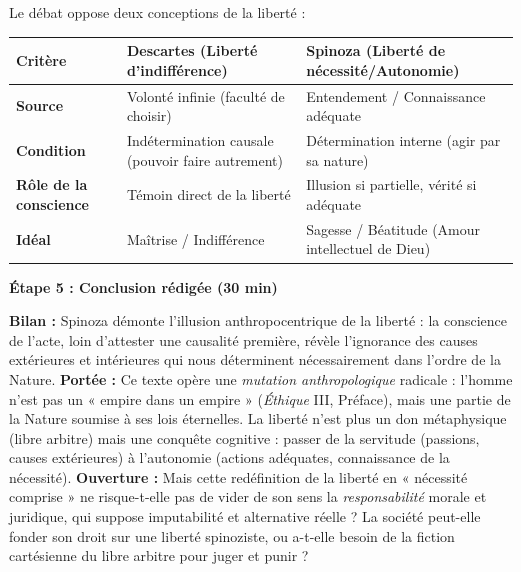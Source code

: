 \documentclass[11pt]{article}
\newcommand{\cle}[1]{{\popxbold\color{popdark}#1}}
\begin{document}
\begin{aretenir}
Le débat oppose deux conceptions de la liberté :
\begin{center}
\begin{tabularx}{\linewidth}{|l|X|X|}\hline
\rowcolor{popblueL}
\textbf{Critère} & \textbf{Descartes (Liberté d'indifférence)} & \textbf{Spinoza (Liberté de nécessité/Autonomie)} \\\hline
\textbf{Source} & Volonté infinie (faculté de choisir) & Entendement / Connaissance adéquate \\\hline
\textbf{Condition} & Indétermination causale (pouvoir faire autrement) & Détermination interne (agir par sa nature) \\\hline
\textbf{Rôle de la conscience} & Témoin direct de la liberté & Illusion si partielle, vérité si adéquate \\\hline
\textbf{Idéal} & Maîtrise / Indifférence & Sagesse / Béatitude (Amour intellectuel de Dieu) \\\hline
\end{tabularx}
\end{center}
\end{aretenir}

\textbf{Étape 5 : Conclusion rédigée (30 min)}\par

\begin{exemplebox}
\textbf{Bilan :} Spinoza démonte l'illusion anthropocentrique de la liberté : la conscience de l'acte, loin d'attester une causalité première, révèle l'ignorance des causes extérieures et intérieures qui nous déterminent nécessairement dans l'ordre de la Nature.
\textbf{Portée :} Ce texte opère une \emph{mutation anthropologique} radicale : l'homme n'est pas un « empire dans un empire » (\emph{Éthique} III, Préface), mais une partie de la Nature soumise à ses lois éternelles. La liberté n'est plus un don métaphysique (libre arbitre) mais une \cle{conquête cognitive} : passer de la servitude (passions, causes extérieures) à l'autonomie (actions adéquates, connaissance de la nécessité).
\textbf{Ouverture :} Mais cette redéfinition de la liberté en « nécessité comprise » ne risque-t-elle pas de vider de son sens la \emph{responsabilité} morale et juridique, qui suppose imputabilité et alternative réelle ? La société peut-elle fonder son droit sur une liberté spinoziste, ou a-t-elle besoin de la fiction cartésienne du libre arbitre pour juger et punir ?
\end{exemplebox}
\end{document}
